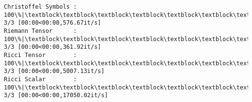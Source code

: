 \documentclass[11pt]{article}
\newcommand{\prompt}[4]{
        {\ttfamily\llap{{\color{#2}[#3]:\hspace{3pt}#4}}\vspace{-\baselineskip}}
    }
\begin{document}
    \begin{Verbatim}[commandchars=\\\{\}]
Christoffel Symbols : 100\%|\textblock\textblock\textblock\textblock\textblock\textblock\textblock\textblock\textblock\textblock\textblock\textblock\textblock\textblock\textblock\textblock\textblock\textblock\textblock\textblock\textblock\textblock\textblock\textblock\textblock\textblock\textblock\textblock\textblock\textblock\textblock\textblock\textblock\textblock| 3/3 [00:00<00:00,576.67it/s]
Riemann Tensor      : 100\%|\textblock\textblock\textblock\textblock\textblock\textblock\textblock\textblock\textblock\textblock\textblock\textblock\textblock\textblock\textblock\textblock\textblock\textblock\textblock\textblock\textblock\textblock\textblock\textblock\textblock\textblock\textblock\textblock\textblock\textblock\textblock\textblock\textblock\textblock| 3/3 [00:00<00:00,361.92it/s]
Ricci Tensor        : 100\%|\textblock\textblock\textblock\textblock\textblock\textblock\textblock\textblock\textblock\textblock\textblock\textblock\textblock\textblock\textblock\textblock\textblock\textblock\textblock\textblock\textblock\textblock\textblock\textblock\textblock\textblock\textblock\textblock\textblock\textblock\textblock\textblock\textblock| 3/3 [00:00<00:00,5007.13it/s]
Ricci Scalar        : 100\%|\textblock\textblock\textblock\textblock\textblock\textblock\textblock\textblock\textblock\textblock\textblock\textblock\textblock\textblock\textblock\textblock\textblock\textblock\textblock\textblock\textblock\textblock\textblock\textblock\textblock\textblock\textblock\textblock\textblock\textblock\textblock\textblock| 3/3 [00:00<00:00,17050.02it/s]
    \end{Verbatim}
 
            
\prompt{Out}{outcolor}{6}{}
\end{document}
